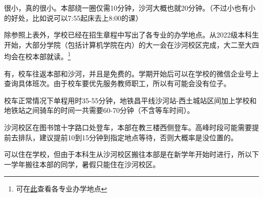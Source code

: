 
很小，真的很小。本部绕一圈仅需10分钟，沙河大概也就20分钟。{\small （不过小也有小的好处，比如说可以7:55起床去上8:00的课）}


除参照上表外，学校已经在招生章程中写出了各专业的办学地点。从2022级本科生开始，大部分学院（包括计算机学院在内）的大一会在沙河校区完成，大二至大四均会在校本部就读。\footnote{可在\href{https://zsb.bupt.edu.cn/info/1005/1992.htm}{此}查看各专业办学地点}


有，校车往返本部和沙河，并且是免费的。学期开始后可以在学校的微信企业号上查询具体班次。由于校车要优先服务教师职工，所以有可能会没有位子。

校车正常情况下单程用时35-55分钟，地铁昌平线沙河站-西土城站区间加上学校和地铁站之间骑车的时间一共需要60-70分钟（不含等车时间）。

沙河校区在图书馆十字路口处登车，本部在教三楼西侧登车。高峰时段可能需要提前去排队，建议提前10到15分钟到指定地点等待，否则大概率是没位置的。


可以住在学校，但由于本科生从沙河校区搬往本部是在新学年开始时进行，所以下一学年搬往本部的同学，暑假只能住在沙河校区。
